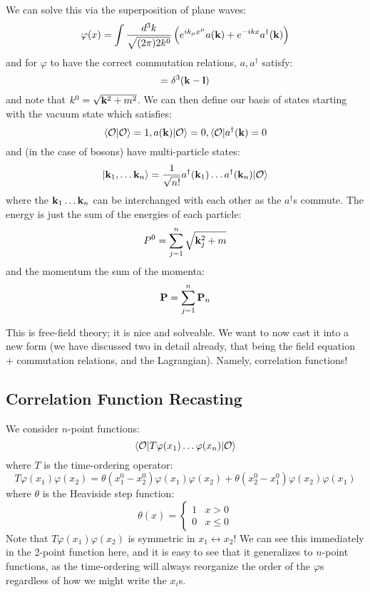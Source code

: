 We can solve this via the superposition of plane waves:
\begin{equation}
    \varphi(x) = \int \frac{d^3k}{\sqrt{(2\pi)2k^0}}\left(e^{ik_\mu x^\mu}a(\v{k}) + e^{-ikx}a^\dag(\v{k})\right)
\end{equation}
and for $\varphi$ to have the correct commutation relations, $a, a^\dag$ satisfy:
\begin{equation}
    [a(\v{k}), a^\dag(\v{l})] = \delta^3(\v{k} - \v{l})
\end{equation}
and note that $k^0 = \sqrt{\mathbf{k}^2 + m^2}$. We can then define our basis of states starting with the vacuum state which satisfies:
\begin{equation}
    \langle \mathcal{O} \lvert \mathcal{O} \rangle = 1, a(\mathbf{k})\lvert \mathcal{O} \rangle = 0, \langle \mathcal{O} \rvert a^\dagger(\mathbf{k}) = 0
\end{equation}
and (in the case of bosons) have multi-particle states:
\begin{equation}
    \lvert \mathbf{k}_1, \ldots \mathbf{k}_n \rangle = \frac{1}{\sqrt{n!}}a^\dagger(\mathbf{k}_1)\ldots a^\dagger(\mathbf{k}_n)\lvert \mathcal{O} \rangle
\end{equation}
where the $\mathbf{k}_1 \ldots \mathbf{k}_n$ can be interchanged with each other as the $a^\dag$s commute. The energy is just the sum of the energies of each particle:
\begin{equation}
    P^0 = \sum_{j=1}^n \sqrt{\mathbf{k}_j^2 + m}
\end{equation}
and the momentum the sum of the momenta:
\begin{equation}
    \mathbf{P} = \sum_{j=1}^n \mathbf{P}_n
\end{equation}

This is free-field theory; it is nice and solveable. We want to now cast it into a new form (we have discussed two in detail already, that being the field equation + commutation relations, and the Lagrangian). Namely, correlation functions!

\subsection{Correlation Function Recasting}
We consider $n$-point functions:
\begin{equation}
    \bra{\O}T\varphi(x_1) \ldots \varphi(x_n)\ket{\O}
\end{equation}
where $T$ is the time-ordering operator:
\begin{equation}
    T\varphi(x_1)\varphi(x_2) = \theta(x_1^0 - x_2^0)\varphi(x_1)\varphi(x_2) + \theta(x_2^0 - x_1^0)\varphi(x_2)\varphi(x_1)
\end{equation}
where $\theta$ is the Heaviside step function:
\begin{equation}
    \theta(x) = \begin{cases}
        1 & x > 0
        \\ 0 & x \leq 0
    \end{cases}
\end{equation}
Note that $T\varphi(x_1)\varphi(x_2)$ is symmetric in $x_1 \leftrightarrow x_2$! We can see this immediately in the 2-point function here, and it is easy to see that it generalizes to $n$-point functions, as the time-ordering will always reorganize the order of the $\varphi$s regardless of how we might write the $x_i$s. 


